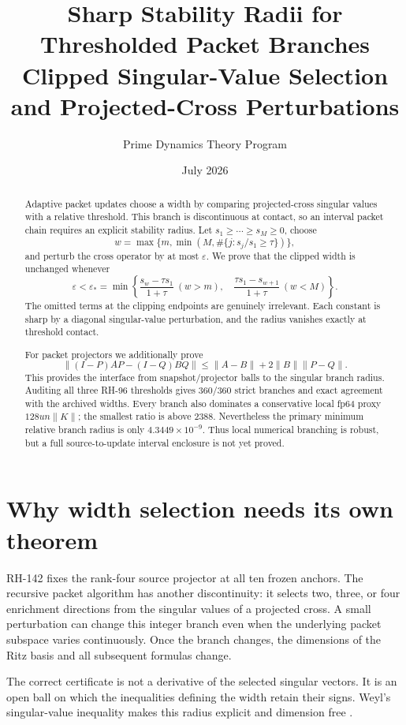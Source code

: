 \documentclass[12pt]{article}
\title{Sharp Stability Radii for Thresholded Packet Branches\\\large Clipped Singular-Value Selection and Projected-Cross Perturbations}
\author{Prime Dynamics Theory Program}
\date{July 2026}
\begin{document}
\maketitle

\begin{abstract}
Adaptive packet updates choose a width by comparing projected-cross singular
values with a relative threshold.  This branch is discontinuous at contact,
so an interval packet chain requires an explicit stability radius.  Let
$s_1\geq\cdots\geq s_M\geq0$, choose
\[
 w=\max\{m,\min(M,\#\{j:s_j/s_1\geq\tau\})\},
\]
and perturb the cross operator by at most $\varepsilon$.  We prove that the
clipped width is unchanged whenever
\[
 \varepsilon<\varepsilon_*=
 \min\left\{
 \frac{s_w-\tau s_1}{1+\tau}\ (w>m),\quad
 \frac{\tau s_1-s_{w+1}}{1+\tau}\ (w<M)
 \right\}.
\]
The omitted terms at the clipping endpoints are genuinely irrelevant.  Each
constant is sharp by a diagonal singular-value perturbation, and the radius
vanishes exactly at threshold contact.

For packet projectors we additionally prove
\[
 \|(I-P)AP-(I-Q)BQ\|
 \leq\|A-B\|+2\|B\|\|P-Q\|.
\]
This provides the interface from snapshot/projector balls to the singular
branch radius.  Auditing all three RH-96 thresholds gives 360/360 strict
branches and exact agreement with the archived widths.  Every branch also
dominates a conservative local fp64 proxy $128u n\|K\|$; the smallest ratio
is above $2388$.  Nevertheless the primary minimum relative branch radius is
only $4.3449\times10^{-9}$.  Thus local numerical branching is robust, but a
full source-to-update interval enclosure is not yet proved.
\end{abstract}

\section{Why width selection needs its own theorem}
RH-142 fixes the rank-four source projector at all ten frozen anchors.  The
recursive packet algorithm has another discontinuity: it selects two, three,
or four enrichment directions from the singular values of a projected
cross.  A small perturbation can change this integer branch even when the
underlying packet subspace varies continuously.  Once the branch changes,
the dimensions of the Ritz basis and all subsequent formulas change.

The correct certificate is not a derivative of the selected singular
vectors.  It is an open ball on which the inequalities defining the width
retain their signs.  Weyl's singular-value inequality makes this radius
explicit and dimension free \citep{StewartSun1990}.
\end{document}
